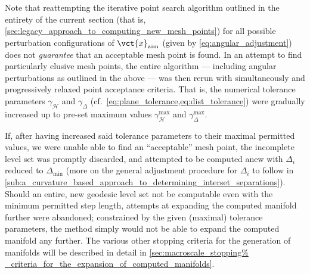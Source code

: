 Note that reattempting the iterative point search algorithm outlined in
the entirety of the current section (that is,
\cref{sec:legacy_approach_to_computing_new_mesh_points}) for all possible
perturbation configurations of $\vct{x}_{\text{aim}}$ (given by
\cref{eq:angular_adjustment}) does not \emph{guarantee} that an
acceptable mesh point is found. In an attempt to find particularly elusive mesh
points, the entire algorithm --- including angular perturbations as outlined in
the above --- was then rerun with simultaneously and progressively relaxed
point acceptance criteria. That is, the numerical tolerance parameters
$\gamma_{\mathcal{H}}$ and $\gamma_{\Delta}$ (cf.\
\cref{eq:plane_tolerance,eq:dist_tolerance}) were gradually increased up to
pre-set maximum values $\gamma_{\mathcal{H}}^{\max}$ and
$\gamma_{\Delta}^{\max}$.

If, after having increased said tolerance parameters to their maximal
permitted values, we were unable able to find an ``acceptable'' mesh point, the
incomplete level set was promptly discarded, and attempted to be computed
anew with $\Delta_{i}$ reduced to $\Delta_{\min}$ (more on the general
adjustment procedure for $\Delta_{i}$ to follow in
\cref{sub:a_curvature_based_approach_to_determining_interset_separations}).
Should an entire, new geodesic level set not be computable even with the
minimum permitted step length, attempts at expanding the computed manifold
further were abandoned; constrained by the given (maximal) tolerance
parameters, the method simply would not be able to expand the computed manifold
any further. The various other stopping criteria for the generation of
manifolds will be described in detail in \cref{sec:macroscale_stopping%
_criteria_for_the_expansion_of_computed_manifolds}.

